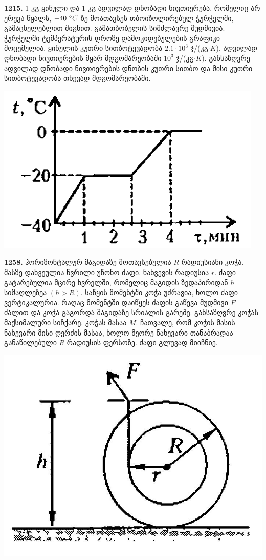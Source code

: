 \documentclass[12pt,a4paper,]{report}
\begin{document}
\textbf{1215.} 1 კგ ყინული და 1 კგ ადვილად დნობადი ნივთიერება, რომელიც არ ერევა წყალს, $-40\ \degree C$-ზე მოათავსეს თბოიზოლირებულ ჭურჭელში, გამაცხელებლით შიგნით. გამათბობელის სიმძლავრე მუდმივია. ჭურჭელში ტემპერატურის დროზე დამოკიდებულების გრაფიკი მოცემულია. ყინულის კუთრი სითბოტევადობა $2.1\cdot10^3$ ჯ/(კგ$\cdot K$), ადვილად დნობადი ნივთიერების მყარ მდგომარეობაში $10^3$ ჯ/(კგ$\cdot K$). განსაზღვრე ადვილად დნობადი ნივთიერების დნობის კუთრი სითბო და მისი კუთრი სითბოტევადობა თხევად მდგომარეობაში.
		\begin{center}
			\includegraphics[scale=0.5]{images/F1215.png}
		\end{center}
	
\textbf{1258.} ჰორიზონტალურ მაგიდაზე მოთავსებულია $R$ რადიუსიანი კოჭა. მასზე დახვეულია წვრილი უწონო ძაფი. ნახვევის რადიუსია $r$. ძაფი გატარებულია მცირე ხვრელში, რომელიც მაგიდის ზედაპირიდან $h$ სიმაღლეზეა $(h>R)$. საწყის მომენტში კოჭა უძრავია, ხოლო ძაფი ვერტიკალურია. რაღაც მომენტში დაიწყეს ძაფის გაწევა მუდმივი $F$ ძალით და კოჭა გაგორდა მაგიდაზე სრიალის გარეშე. განსაზღვრე კოჭას მაქსიმალური სიჩქარე. კოჭას მასაა $M$. ჩათვალე, რომ კოჭის მასის ნახევარი მისი ღერძის მასაა, ხოლო მეორე ნახევარი თანაბრადაა განაწილებული $R$ რადიუსის ფერსოზე. ძაფი გლუვად მიიჩნიე.
		\begin{center}
			\includegraphics[scale=0.2]{images/F1258.jpg}
		\end{center}
\end{document}
